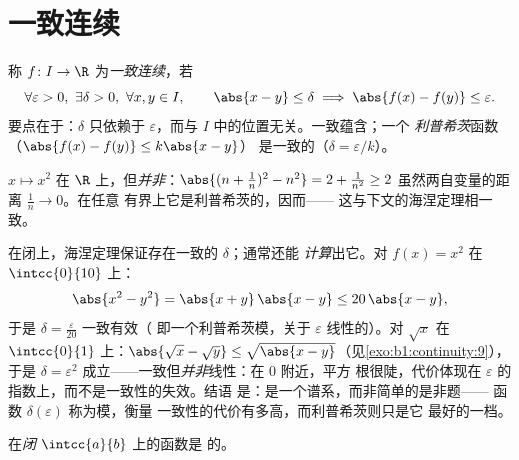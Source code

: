 \section{一致连续}

\begin{definition}\label{def:b1:continuity:uniform}
称 $f \colon I \to \R$ 为\emph{一致连续}，若
\[
\forall \varepsilon > 0,\ \exists \delta > 0,\ \forall x, y \in I,
\qquad \abs{x - y} \leq \delta \implies \abs{f(x) - f(y)} \leq
\varepsilon .
\]
要点在于：$\delta$ 只依赖于 $\varepsilon$，而与
$I$ 中的位置无关。一致蕴含；一个
\emph{利普希茨}函数（$\abs{f(x) - f(y)} \leq k \abs{x - y}$）
是一致的（$\delta = \varepsilon/k$）。
\end{definition}

\begin{example}\label{ex:b1:continuity:notuniform}
$x \mapsto x^2$ 在 $\R$ 上，但\emph{并非}：$\abs{(n + \frac 1n)^2 - n^2} = 2 + \frac{1}{n^2} \geq 2$
虽然两自变量的距离 $\frac 1n \to 0$。在任意
有界上它是利普希茨的，因而——
这与下文的海涅定理相一致。
\end{example}

\begin{example}[一致连续模的显式计算]\label{ex:b1:continuity:moduli}
在闭上，海涅定理保证存在一致的 $\delta$；通常还能
\emph{计算}出它。对 $f(x) = x^2$ 在 $\intcc{0}{10}$ 上：
\[
\abs{x^2 - y^2} = \abs{x + y}\,\abs{x - y} \leq 20\,\abs{x - y},
\]
于是 $\delta = \frac{\varepsilon}{20}$ 一致有效（
即一个利普希茨模，关于 $\varepsilon$ 线性的）。对 $\sqrt x$ 在
$\intcc{0}{1}$ 上：$\abs{\sqrt x - \sqrt y} \leq \sqrt{\abs{x -
y}}$（见\cref{exo:b1:continuity:9}），于是 $\delta = \varepsilon^2$
成立——一致但\emph{并非}线性：在 $0$ 附近，平方
根很陡，代价体现在
$\varepsilon$ 的指数上，而不是一致性的失效。结语
是：是一个谱系，而非简单的是非题——
函数 $\delta(\varepsilon)$ 称为模，衡量
一致性的代价有多高，而利普希茨则只是它
最好的一档。
\end{example}

\begin{theorem}[海涅]\label{thm:b1:continuity:heine}
在\emph{闭} $\intcc{a}{b}$ 上的函数是
的。
\end{theorem}

